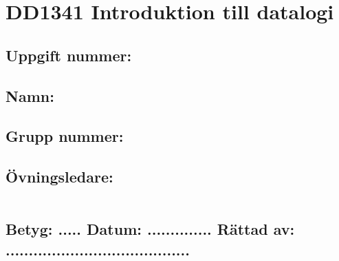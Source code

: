 \thispagestyle{empty}
\section*{DD1341 Introduktion till datalogi}

\vspace{10mm}

\subsection*{Uppgift nummer: \assignmentnr}

\vspace{3mm}

\subsection*{Namn: \theauthor}

\vspace{3mm}

\subsection*{Grupp nummer: \groupnr}

\vspace{3mm}

\subsection*{Övningsledare: \courseleader}


\vspace{10mm}

\begin{tabular}{l}
 \hspace{140mm} \\
\hline \hline
\end{tabular}

\vspace{5mm}

\subsection*{Betyg: ..... \hspace{2mm}  Datum: .............. \hspace{2mm} Rättad av: ........................................}
